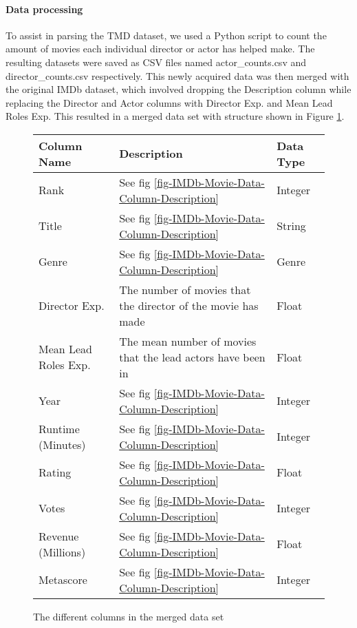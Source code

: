     \paragraph{Data processing}
        To assist in parsing the TMD dataset, we used a Python script to count the amount of movies each individual director or actor
            has helped make.
        The resulting datasets were saved as CSV files named actor\_counts.csv and director\_counts.csv respectively.
        This newly acquired data was then merged with the original IMDb dataset, which involved dropping the Description column while
            replacing the Director and Actor columns with Director Exp. and Mean Lead Roles Exp.
        This resulted in a merged data set with structure shown in Figure \ref*{fig-merged-data-column-description}.
        \begin{figure}[h]
            \begin{tabular}[width = \textwidth]{lll}
                \toprule
                Column Name &           Description                                                                 & Data Type \\
                \midrule
                Rank &                  See fig \ref*{fig-IMDb-Movie-Data-Column-Description}                       & Integer \\          
                Title &                 See fig \ref*{fig-IMDb-Movie-Data-Column-Description}                       & String \\
                Genre &                 See fig \ref*{fig-IMDb-Movie-Data-Column-Description}                       & Genre \\
                Director Exp. &         The number of movies that the director of the movie has made                & Float \\
                Mean Lead Roles Exp. &  The mean number of movies that the lead actors have been in                 & Float \\
                Year  &                 See fig \ref*{fig-IMDb-Movie-Data-Column-Description}                       & Integer \\
                Runtime (Minutes) &     See fig \ref*{fig-IMDb-Movie-Data-Column-Description}                       & Integer \\ 
                Rating   &              See fig \ref*{fig-IMDb-Movie-Data-Column-Description}                       & Float \\
                Votes   &               See fig \ref*{fig-IMDb-Movie-Data-Column-Description}                       & Integer \\ 
                Revenue (Millions) &    See fig \ref*{fig-IMDb-Movie-Data-Column-Description}                       & Float \\  
                Metascore   &           See fig \ref*{fig-IMDb-Movie-Data-Column-Description}                       & Integer \\
                \bottomrule
            \end{tabular}
        \caption[short]{The different columns in the merged data set}\label{fig-merged-data-column-description}
        \end{figure}

